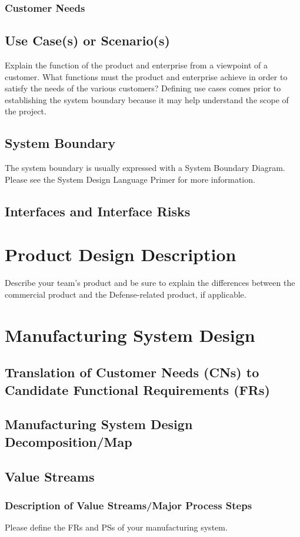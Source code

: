 \documentclass{ipfwpaper}
\begin{document}
        \subsubsection{Customer Needs}
        \subsection{Use Case(s) or Scenario(s)} 
         Explain the function of the product and enterprise from a viewpoint of a customer. What functions must the product and enterprise achieve in order to satisfy the needs of the various customers? Defining use cases comes prior to establishing the system boundary because it may help understand the scope of the project. 
    	\subsection{System Boundary}
	   The system boundary is usually expressed with a System Boundary Diagram. Please see the System Design Language Primer for more information.
    \subsection{Interfaces and Interface Risks}
    
    
\section{Product Design Description}
Describe your team's product and be sure to explain the differences between the commercial product and the Defense-related product, if applicable.

\section{Manufacturing System Design}
	\subsection{Translation of Customer Needs (CNs) to Candidate Functional  Requirements (FRs)}
    \subsection{Manufacturing System Design Decomposition/Map}
    \subsection{Value Streams}
    	\subsubsection{Description of Value Streams/Major Process Steps}
    	Please define the FRs and PSs of your manufacturing system.
\end{document}
